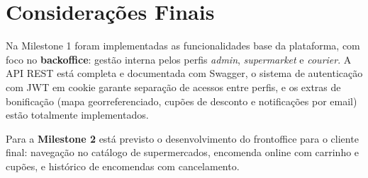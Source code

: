 \documentclass[12pt,a4paper]{article}
\begin{document}
\section{Considerações Finais}

Na Milestone 1 foram implementadas as funcionalidades base da plataforma, com foco no \textbf{backoffice}: gestão interna pelos perfis \textit{admin}, \textit{supermarket} e \textit{courier}. A API REST está completa e documentada com Swagger, o sistema de autenticação com JWT em cookie garante separação de acessos entre perfis, e os extras de bonificação (mapa georreferenciado, cupões de desconto e notificações por email) estão totalmente implementados.

Para a \textbf{Milestone 2} está previsto o desenvolvimento do frontoffice para o cliente final: navegação no catálogo de supermercados, encomenda online com carrinho e cupões, e histórico de encomendas com cancelamento.
\end{document}
